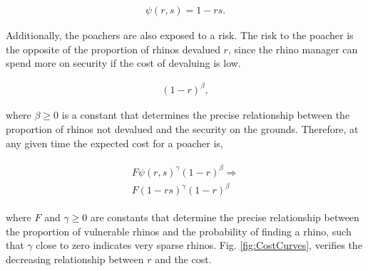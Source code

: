 \documentclass[10pt]{article}
\begin{document}
\begin{eqnarray}
	\label{eqn:psi}
	\psi(r, s) = 1 - rs.
\end{eqnarray}

Additionally, the poachers are also exposed to a risk. The risk to the poacher is
the opposite of the proportion of rhinos devalued \(r\), since the rhino manager
can spend more on security if the cost of devaluing is low.

\begin{eqnarray}
	\label{eqn:risk}
	(1 - r)^{\beta},
\end{eqnarray}

where \(\beta \geq 0\) is a constant that determines the precise relationship between
the proportion of rhinos not devalued and the security on the grounds. Therefore,
at any given time the expected cost for a poacher is, 

\begin{eqnarray}
	\label{eqn:individual_cost}
	\begin{array}{l}
	F \psi(r, s)^{\gamma} (1 - r)^{\beta} \Rightarrow \\
	F (1 - rs) ^{\gamma} (1 - r) ^{\beta}
	\end{array}
\end{eqnarray}

where \(F\) and \(\gamma \geq 0\) are constants that determine the precise relationship
between the proportion of vulnerable rhinos and the probability of finding a rhino,
such that \(\gamma\) close to zero indicates very sparse rhinos. Fig.
\ref{fig:CostCurves},  verifies the decreasing relationship between \(r\) and the
cost.
\end{document}
